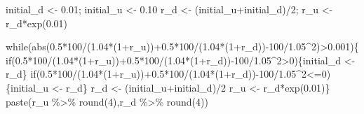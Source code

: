 \documentclass[
  letterpaper,
  DIV=11,
  numbers=noendperiod]{scrreprt}
\newenvironment{Shaded}{\begin{snugshade}}{\end{snugshade}}
\newcommand{\ControlFlowTok}[1]{\textcolor[rgb]{0.00,0.23,0.31}{#1}}
\newcommand{\DecValTok}[1]{\textcolor[rgb]{0.68,0.00,0.00}{#1}}
\newcommand{\FloatTok}[1]{\textcolor[rgb]{0.68,0.00,0.00}{#1}}
\newcommand{\FunctionTok}[1]{\textcolor[rgb]{0.28,0.35,0.67}{#1}}
\newcommand{\NormalTok}[1]{\textcolor[rgb]{0.00,0.23,0.31}{#1}}
\newcommand{\OtherTok}[1]{\textcolor[rgb]{0.00,0.23,0.31}{#1}}
\newcommand{\SpecialCharTok}[1]{\textcolor[rgb]{0.37,0.37,0.37}{#1}}
\begin{document}
\begin{Shaded}
\begin{Highlighting}[]
\NormalTok{initial\_d }\OtherTok{\textless{}{-}} \FloatTok{0.01}\NormalTok{; initial\_u }\OtherTok{\textless{}{-}} \FloatTok{0.10}
\NormalTok{r\_d }\OtherTok{\textless{}{-}}\NormalTok{ (initial\_u}\SpecialCharTok{+}\NormalTok{initial\_d)}\SpecialCharTok{/}\DecValTok{2}\NormalTok{; r\_u }\OtherTok{\textless{}{-}}\NormalTok{ r\_d}\SpecialCharTok{*}\FunctionTok{exp}\NormalTok{(}\FloatTok{0.01}\NormalTok{)}

\ControlFlowTok{while}\NormalTok{(}\FunctionTok{abs}\NormalTok{(}\FloatTok{0.5}\SpecialCharTok{*}\DecValTok{100}\SpecialCharTok{/}\NormalTok{(}\FloatTok{1.04}\SpecialCharTok{*}\NormalTok{(}\DecValTok{1}\SpecialCharTok{+}\NormalTok{r\_u))}\SpecialCharTok{+}\FloatTok{0.5}\SpecialCharTok{*}\DecValTok{100}\SpecialCharTok{/}\NormalTok{(}\FloatTok{1.04}\SpecialCharTok{*}\NormalTok{(}\DecValTok{1}\SpecialCharTok{+}\NormalTok{r\_d))}\SpecialCharTok{{-}}\DecValTok{100}\SpecialCharTok{/}\FloatTok{1.05}\SpecialCharTok{\^{}}\DecValTok{2}\NormalTok{)}\SpecialCharTok{\textgreater{}}\FloatTok{0.001}\NormalTok{)\{}
  \ControlFlowTok{if}\NormalTok{(}\FloatTok{0.5}\SpecialCharTok{*}\DecValTok{100}\SpecialCharTok{/}\NormalTok{(}\FloatTok{1.04}\SpecialCharTok{*}\NormalTok{(}\DecValTok{1}\SpecialCharTok{+}\NormalTok{r\_u))}\SpecialCharTok{+}\FloatTok{0.5}\SpecialCharTok{*}\DecValTok{100}\SpecialCharTok{/}\NormalTok{(}\FloatTok{1.04}\SpecialCharTok{*}\NormalTok{(}\DecValTok{1}\SpecialCharTok{+}\NormalTok{r\_d))}\SpecialCharTok{{-}}\DecValTok{100}\SpecialCharTok{/}\FloatTok{1.05}\SpecialCharTok{\^{}}\DecValTok{2}\SpecialCharTok{\textgreater{}}\DecValTok{0}\NormalTok{)\{initial\_d }\OtherTok{\textless{}{-}}\NormalTok{ r\_d\}}
  \ControlFlowTok{if}\NormalTok{(}\FloatTok{0.5}\SpecialCharTok{*}\DecValTok{100}\SpecialCharTok{/}\NormalTok{(}\FloatTok{1.04}\SpecialCharTok{*}\NormalTok{(}\DecValTok{1}\SpecialCharTok{+}\NormalTok{r\_u))}\SpecialCharTok{+}\FloatTok{0.5}\SpecialCharTok{*}\DecValTok{100}\SpecialCharTok{/}\NormalTok{(}\FloatTok{1.04}\SpecialCharTok{*}\NormalTok{(}\DecValTok{1}\SpecialCharTok{+}\NormalTok{r\_d))}\SpecialCharTok{{-}}\DecValTok{100}\SpecialCharTok{/}\FloatTok{1.05}\SpecialCharTok{\^{}}\DecValTok{2}\SpecialCharTok{\textless{}=}\DecValTok{0}\NormalTok{)\{initial\_u }\OtherTok{\textless{}{-}}\NormalTok{ r\_d\}}
\NormalTok{  r\_d }\OtherTok{\textless{}{-}}\NormalTok{ (initial\_u}\SpecialCharTok{+}\NormalTok{initial\_d)}\SpecialCharTok{/}\DecValTok{2}
\NormalTok{  r\_u }\OtherTok{\textless{}{-}}\NormalTok{ r\_d}\SpecialCharTok{*}\FunctionTok{exp}\NormalTok{(}\FloatTok{0.01}\NormalTok{)\}}
\FunctionTok{paste}\NormalTok{(r\_u }\SpecialCharTok{\%\textgreater{}\%} \FunctionTok{round}\NormalTok{(}\DecValTok{4}\NormalTok{),r\_d }\SpecialCharTok{\%\textgreater{}\%} \FunctionTok{round}\NormalTok{(}\DecValTok{4}\NormalTok{))}
\end{Highlighting}
\end{Shaded}
\end{document}
